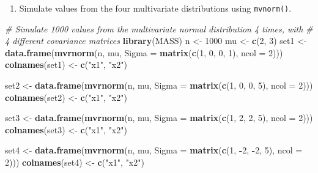 \documentclass[
]{article}
\newenvironment{Shaded}{\begin{snugshade}}{\end{snugshade}}
\newcommand{\AttributeTok}[1]{\textcolor[rgb]{0.13,0.29,0.53}{#1}}
\newcommand{\CommentTok}[1]{\textcolor[rgb]{0.56,0.35,0.01}{\textit{#1}}}
\newcommand{\DecValTok}[1]{\textcolor[rgb]{0.00,0.00,0.81}{#1}}
\newcommand{\FunctionTok}[1]{\textcolor[rgb]{0.13,0.29,0.53}{\textbf{#1}}}
\newcommand{\NormalTok}[1]{#1}
\newcommand{\OtherTok}[1]{\textcolor[rgb]{0.56,0.35,0.01}{#1}}
\newcommand{\SpecialCharTok}[1]{\textcolor[rgb]{0.81,0.36,0.00}{\textbf{#1}}}
\newcommand{\StringTok}[1]{\textcolor[rgb]{0.31,0.60,0.02}{#1}}
\providecommand{\tightlist}{%
  \setlength{\itemsep}{0pt}\setlength{\parskip}{0pt}}
\begin{document}
\begin{enumerate}
\def\labelenumi{\alph{enumi})}
\tightlist
\item
  Simulate values from the four multivariate distributions using
  \texttt{mvnorm()}.
\end{enumerate}

\begin{Shaded}
\begin{Highlighting}[]
\CommentTok{\# Simulate 1000 values from the multivariate normal distribution 4 times, with }
\CommentTok{\# 4 different covariance matrices}
\FunctionTok{library}\NormalTok{(MASS)}
\NormalTok{n }\OtherTok{\textless{}{-}} \DecValTok{1000}
\NormalTok{mu }\OtherTok{\textless{}{-}} \FunctionTok{c}\NormalTok{(}\DecValTok{2}\NormalTok{, }\DecValTok{3}\NormalTok{)}
\NormalTok{set1 }\OtherTok{\textless{}{-}} \FunctionTok{data.frame}\NormalTok{(}\FunctionTok{mvrnorm}\NormalTok{(n, mu, }\AttributeTok{Sigma =} \FunctionTok{matrix}\NormalTok{(}\FunctionTok{c}\NormalTok{(}\DecValTok{1}\NormalTok{, }\DecValTok{0}\NormalTok{, }\DecValTok{0}\NormalTok{, }\DecValTok{1}\NormalTok{), }\AttributeTok{ncol =} \DecValTok{2}\NormalTok{)))}
\FunctionTok{colnames}\NormalTok{(set1) }\OtherTok{\textless{}{-}} \FunctionTok{c}\NormalTok{(}\StringTok{"x1"}\NormalTok{, }\StringTok{"x2"}\NormalTok{)}

\NormalTok{set2 }\OtherTok{\textless{}{-}} \FunctionTok{data.frame}\NormalTok{(}\FunctionTok{mvrnorm}\NormalTok{(n, mu, }\AttributeTok{Sigma =} \FunctionTok{matrix}\NormalTok{(}\FunctionTok{c}\NormalTok{(}\DecValTok{1}\NormalTok{, }\DecValTok{0}\NormalTok{, }\DecValTok{0}\NormalTok{, }\DecValTok{5}\NormalTok{), }\AttributeTok{ncol =} \DecValTok{2}\NormalTok{)))}
\FunctionTok{colnames}\NormalTok{(set2) }\OtherTok{\textless{}{-}} \FunctionTok{c}\NormalTok{(}\StringTok{"x1"}\NormalTok{, }\StringTok{"x2"}\NormalTok{)}

\NormalTok{set3 }\OtherTok{\textless{}{-}} \FunctionTok{data.frame}\NormalTok{(}\FunctionTok{mvrnorm}\NormalTok{(n, mu, }\AttributeTok{Sigma =} \FunctionTok{matrix}\NormalTok{(}\FunctionTok{c}\NormalTok{(}\DecValTok{1}\NormalTok{, }\DecValTok{2}\NormalTok{, }\DecValTok{2}\NormalTok{, }\DecValTok{5}\NormalTok{), }\AttributeTok{ncol =} \DecValTok{2}\NormalTok{)))}
\FunctionTok{colnames}\NormalTok{(set3) }\OtherTok{\textless{}{-}} \FunctionTok{c}\NormalTok{(}\StringTok{"x1"}\NormalTok{, }\StringTok{"x2"}\NormalTok{)}

\NormalTok{set4 }\OtherTok{\textless{}{-}} \FunctionTok{data.frame}\NormalTok{(}\FunctionTok{mvrnorm}\NormalTok{(n, mu, }\AttributeTok{Sigma =} \FunctionTok{matrix}\NormalTok{(}\FunctionTok{c}\NormalTok{(}\DecValTok{1}\NormalTok{, }\SpecialCharTok{{-}}\DecValTok{2}\NormalTok{, }\SpecialCharTok{{-}}\DecValTok{2}\NormalTok{, }\DecValTok{5}\NormalTok{), }\AttributeTok{ncol =} \DecValTok{2}\NormalTok{)))}
\FunctionTok{colnames}\NormalTok{(set4) }\OtherTok{\textless{}{-}} \FunctionTok{c}\NormalTok{(}\StringTok{"x1"}\NormalTok{, }\StringTok{"x2"}\NormalTok{)}
\end{Highlighting}
\end{Shaded}
\end{document}
